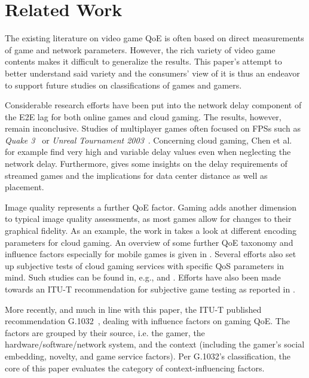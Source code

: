 \section{Related Work}
\label{sec:relatedwork}

The existing literature on video game \gls{QoE} is often based on
direct measurements of game and network parameters. However, the
rich variety of video game contents makes it difficult to generalize
the results. This paper's attempt to better understand said variety
and the consumers' view of it is thus an endeavor to support future
studies on classifications of games and gamers.

Considerable research efforts have been put into the network delay component of the \gls{E2E} lag for both online games and cloud gaming. The results, however, remain inconclusive. Studies of multiplayer games often focused on \glspl{FPS} such as \textit{Quake 3}~\cite{1266180} or \textit{Unreal Tournament 2003}~\cite{Beigbeder:2004:ELL:1016540.1016556}. Concerning cloud gaming, Chen et al.~\cite{6670099} for example find very high and variable delay values even when neglecting the network delay. Furthermore, \cite{Choy:2012:BSC:2501560.2501563} gives some insights on the delay requirements of streamed games and the implications for data center distance as well as placement.

Image quality represents a further \gls{QoE} factor. Gaming adds
another dimension to typical image quality assessments, as most
games allow for changes to their graphical fidelity.
As an example, the work in \cite{slivarimpact} takes a look at different encoding parameters for cloud gaming.%
An overview of some further \gls{QoE} taxonomy and influence factors especially for mobile games is given in \cite{beyer2014typedisplaydelayimpact}. Several efforts also set up subjective tests of cloud gaming services with specific \gls{QoS} parameters in mind. Such studies can be found in, e.g., \cite{Jarschel20132883} and  \cite{6614351}. Efforts have also been made towards an \acrshort{ITU-T} recommendation for subjective game testing as reported in \cite{mollertowards}.

More recently, and much in line with this paper, the \acrshort{ITU-T}
published recommendation G.1032~\cite{itutg1032}, dealing with
influence factors on gaming \gls{QoE}. The factors are grouped by
their source, i.e. the gamer, the hardware/software/network system,
and the context (including the gamer's social embedding, novelty,
and game service factors). Per G.1032's classification, the core of
this paper evaluates the category of context-influencing factors.
